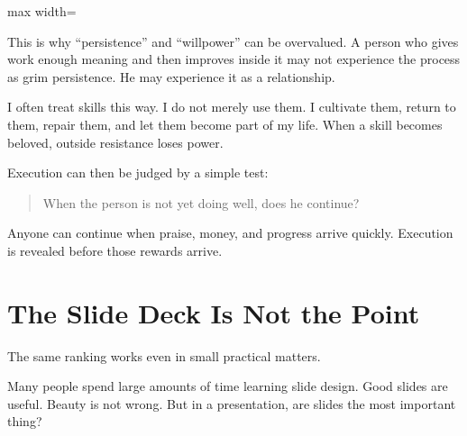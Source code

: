 \begin{center}
\begin{adjustbox}{max width=\linewidth}
\end{adjustbox}
\end{center}

This is why ``persistence'' and ``willpower'' can be overvalued. A person who gives work enough meaning and then improves inside it may not experience the process as grim persistence. He may experience it as a relationship.

I often treat skills this way. I do not merely use them. I cultivate them, return to them, repair them, and let them become part of my life. When a skill becomes beloved, outside resistance loses power.

Execution can then be judged by a simple test:

\begin{quote}
When the person is not yet doing well, does he continue?
\end{quote}

Anyone can continue when praise, money, and progress arrive quickly. Execution is revealed before those rewards arrive.

\section*{The Slide Deck Is Not the Point}

The same ranking works even in small practical matters.

Many people spend large amounts of time learning slide design. Good slides are useful. Beauty is not wrong. But in a presentation, are slides the most important thing?

